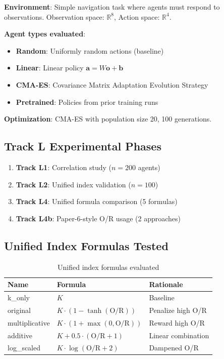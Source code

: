 \documentclass[twoside]{article}
\theoremstyle{remark}
\begin{document}
\textbf{Environment}: Simple navigation task where agents must respond to
observations. Observation space: $\mathbb{R}^8$, Action space: $\mathbb{R}^4$.

\textbf{Agent types evaluated}:
\begin{itemize}
    \item \textbf{Random}: Uniformly random actions (baseline)
    \item \textbf{Linear}: Linear policy $\mathbf{a} = W\mathbf{o} + \mathbf{b}$
    \item \textbf{CMA-ES}: Covariance Matrix Adaptation Evolution Strategy
    \item \textbf{Pretrained}: Policies from prior training runs
\end{itemize}

\textbf{Optimization}: CMA-ES with population size 20, 100 generations.

\subsection{Track L Experimental Phases}

\begin{enumerate}
    \item \textbf{Track L1}: Correlation study ($n = 200$ agents)
    \item \textbf{Track L2}: Unified index validation ($n = 100$)
    \item \textbf{Track L4}: Unified formula comparison (5 formulas)
    \item \textbf{Track L4b}: Paper-6-style O/R usage (2 approaches)
\end{enumerate}

\subsection{Unified Index Formulas Tested}

\begin{table}[h]
\centering
\caption{Unified index formulas evaluated}
\label{tab:formulas}
\begin{tabular}{@{}lll@{}}
\toprule
\textbf{Name} & \textbf{Formula} & \textbf{Rationale} \\
\midrule
k\_only & $K$ & Baseline \\
original & $K \cdot (1 - \tanh(\text{O/R}))$ & Penalize high O/R \\
multiplicative & $K \cdot (1 + \max(0, \text{O/R}))$ & Reward high O/R \\
additive & $K + 0.5 \cdot (\text{O/R} + 1)$ & Linear combination \\
log\_scaled & $K \cdot \log(\text{O/R} + 2)$ & Dampened O/R \\
\bottomrule
\end{tabular}
\end{table}
\end{document}
